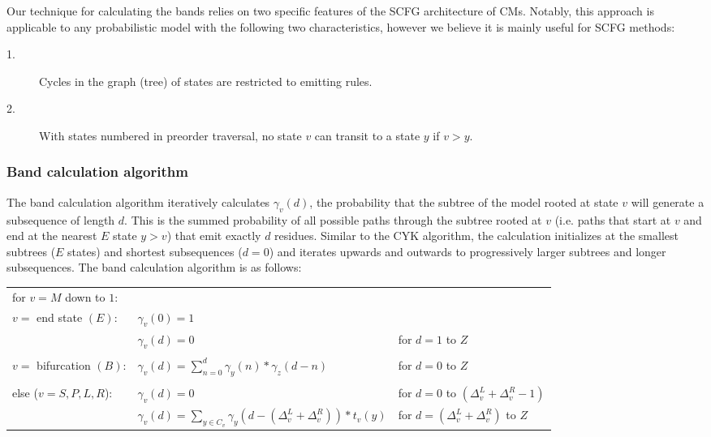 \documentclass[11pt]{article}
\begin{document}
Our technique for calculating the bands 
relies on two specific features of the SCFG architecture of
CMs\@. Notably, this approach is applicable to any probabilistic model
with the following two characteristics, however we believe it is
mainly useful for SCFG methods:

\begin{description}
\item[1.] Cycles in the graph (tree) of states are restricted to emitting
  rules. 
\item[2.] With states numbered in preorder traversal, no state
  $v$ can transit to a state $y$ if $v > y$.
\end{description}

\subsubsection{Band calculation algorithm}
The band calculation algorithm iteratively calculates
$\gamma_v(d)$, the probability that the subtree of the model rooted at state $v$
will generate a subsequence of length $d$. This is the summed probability
of all possible paths through the subtree rooted at $v$ (i.e. paths
that start at $v$ and end at the nearest $E$ state $y > v$) that emit
exactly $d$ residues. 
Similar to the CYK algorithm, the calculation initializes at the
smallest subtrees ($E$ states) and
shortest subsequences ($d=0$) and iterates upwards and outwards to
progressively larger subtrees and longer subsequences. The band
calculation algorithm is as follows:

\vspace{0.5em}
\begin{tabular}{l|l|l}
\multicolumn{3}{l}{for $v = M$ down to $1$:} \\
$v = $ end state $(E)$: & $\gamma_v(0) = 1$ & \\
                        & $\gamma_v(d) = 0$ & for $d=1$ to $Z$ \\
& & \\
$v = $ bifurcation $(B)$: & $\gamma_v(d) = \sum_{n=0}^{d} \gamma_y(n)
* \gamma_z(d-n)$ & for $d = 0$ to $Z$ \\
& & \\
else ($v = S, P, L, R$): & $\gamma_v(d) = 0$ & for $d=0$ to $(\Delta_v^{L} + \Delta_v^{R} -
1)$ \\
& $\gamma_v(d) = \sum_{y \in C_v} \gamma_y(d-(\Delta_v^{L} + \Delta_v^{R})) * t_v(y) $ 
& for $d = (\Delta_v^{L} + \Delta_v^{R})$ to $Z$ \\
\end{tabular}
\vspace{0.5em}
\end{document}
